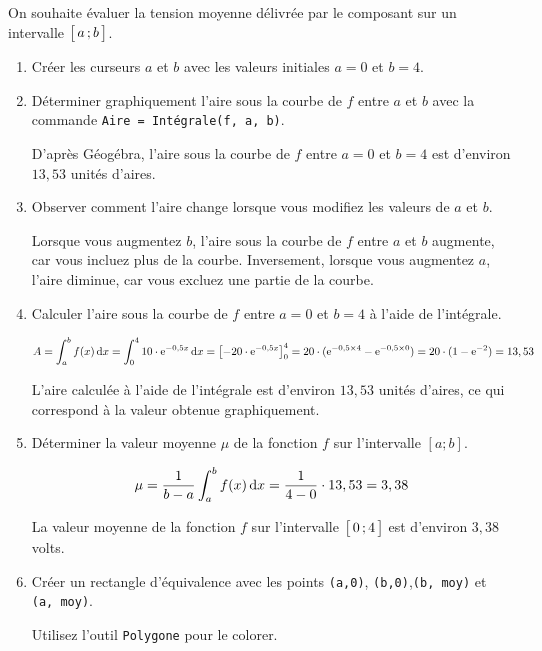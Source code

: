 \documentclass[11pt, a4paper]{report}
\begin{document}
On souhaite évaluer la tension moyenne délivrée par le composant sur un intervalle $\bigl[ \, a \, ; b \,\bigl]$.

\begin{enumerate}[resume]
    \item Créer les curseurs $a$ et $b$ avec les valeurs initiales $a=0$ et $b=4$.   
    \item Déterminer graphiquement l'aire sous la courbe de $f$ entre $a$ et $b$ avec la commande \verb|Aire = Intégrale(f, a, b)|.   
    \begin{blocvisible}[height=2]
        D'après Géogébra, l'aire sous la courbe de $f$ entre $a=0$ et $b=4$ est d'environ $13,53$ unités d'aires.
    \end{blocvisible}       
    
    \pagebreak
    \thispagestyle{DS_LP}

    \item Observer comment l'aire change lorsque vous modifiez les valeurs de $a$ et $b$.  
    \begin{blocvisible}[height=2]
        Lorsque vous augmentez $b$, l'aire sous la courbe de $f$ entre $a$ et $b$ augmente, car vous incluez plus de la courbe. Inversement, lorsque vous augmentez $a$, l'aire diminue, car vous excluez une partie de la courbe.
    \end{blocvisible}
    \item Calculer l'aire sous la courbe de $f$ entre $a=0$ et $b=4$ à l'aide de l'intégrale.  
    \begin{blocvisible}[height=3]
        \[A=\int_a^b f(x) \,\mathrm{d}x = \int_0^4 10\cdot \mathrm{e}^{-0,5x} \,\mathrm{d}x = {\left[-20\cdot \mathrm{e}^{-0,5x} \right]}_0^4 =  20 \cdot (\mathrm{e}^{-0,5\times 4} - \mathrm{e}^{-0,5\times 0}) = 20 \cdot (1 - \mathrm{e}^{-2}) = 13,53\]

        L'aire calculée à l'aide de l'intégrale est d'environ $13,53$ unités d'aires, ce qui correspond à la valeur obtenue graphiquement.
    \end{blocvisible}
    \item Déterminer la valeur moyenne $\mu$ de la fonction $f$ sur l'intervalle $[a ; b]$.  
    \begin{blocvisible}[height=2]           
        \[\mu = \frac{1}{b-a} \int_a^b f(x) \,\mathrm{d}x = \frac{1}{4-0} \cdot 13,53 = 3,38\]

        La valeur moyenne de la fonction $f$ sur l'intervalle $\bigl[ \, 0 \, ; 4 \,\bigl]$ est d'environ $3,38$ volts.
    \end{blocvisible}
    \item Créer un rectangle d'équivalence avec les points \verb|(a,0)|, \verb|(b,0)|,\verb|(b, moy)| et \verb|(a, moy)|. 
    
    Utilisez l'outil \verb|Polygone| pour le colorer.  
\end{enumerate}
\end{document}
